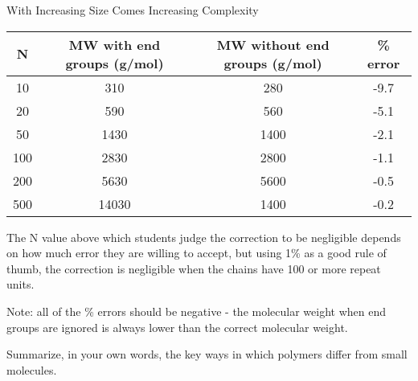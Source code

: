 \begin{activity}{With Increasing Size Comes Increasing Complexity}
\begin{exercises}
\begin{enumerate}
\begin{solution}
{					\begin{center}
						\begin{tabular}{cccc}
						\hline
N   & MW with end groups (g/mol) & MW without end groups (g/mol) & \% error \\\hline
10  & 310                        & 280                           & -9.7     \\
20  & 590                        & 560                           & -5.1     \\
50  & 1430                       & 1400                          & -2.1     \\
100 & 2830                       & 2800                          & -1.1     \\
200 & 5630                       & 5600                          & -0.5     \\
500 & 14030                      & 1400                          & -0.2  
\\\hline  
\end{tabular}
					\end{center}
					
					The N value above which students judge the correction to be negligible depends on how much error they are willing to accept, but using 1\% as a good rule of thumb, the correction is negligible when the chains have 100 or more repeat units.

Note: all of the \% errors should be negative - the molecular weight when end groups are ignored is always lower than the correct molecular weight.

				}\end{solution}
			
		\end{enumerate}
		
	\exercise Summarize, in your own words, the key ways in which polymers differ from small molecules.
	
		\begin{solution}
\end{solution}
\end{exercises}
\end{activity}
